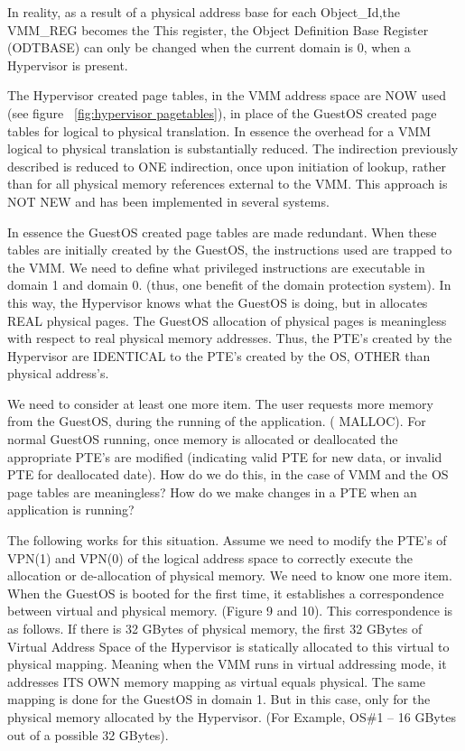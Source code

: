\documentclass{article}
\begin{document}
 In reality, as a result of a physical address base for each Object\_Id,the VMM\_REG becomes the    This register,  the Object Definition Base Register (ODTBASE)  can only be changed when the current domain is 0, when a Hypervisor is present.


 The Hypervisor created page tables, in the VMM address space are NOW used (see figure ~\ref{fig:hypervisor pagetables}), in place of the GuestOS created page tables for logical to physical  translation.   In essence the overhead for a VMM logical to physical  translation is substantially reduced.   The indirection previously described is reduced to ONE indirection, once upon   initiation of lookup,  rather than for all physical memory references external to the VMM. This approach is NOT NEW and has been implemented in several systems.

In essence the GuestOS created page tables are made redundant.  When these tables are initially created by the GuestOS,   the instructions used are trapped to the VMM.  We need to define what privileged instructions are executable in domain 1 and domain 0.  (thus, one benefit of the domain protection system). In this way,  the Hypervisor knows what the GuestOS is doing, but in allocates REAL physical pages.  The GuestOS allocation of physical pages is  meaningless with respect to real physical memory addresses. Thus, the PTE’s created by the Hypervisor are IDENTICAL to the PTE’s created by the OS, OTHER than physical address’s.  

We need to consider at least one more item.  The user requests more memory from the GuestOS, during the running of the application. ( MALLOC).  For normal GuestOS running,  once memory is allocated or deallocated the appropriate PTE’s are modified (indicating valid PTE for new data, or invalid PTE for deallocated date). How do we do this, in the case of VMM and the OS page tables are meaningless?   How do we make changes in a PTE when an application is running?

The following works for this situation.  Assume we need to modify the PTE’s of VPN(1) and VPN(0) of the logical address space  to correctly execute the allocation or de-allocation of physical memory. We need to know one more item.  When the GuestOS is booted for the first time,  it establishes a correspondence  between virtual and physical memory. (Figure 9 and 10). This correspondence is as follows.  If there is 32 GBytes of physical memory,  the first 32 GBytes of Virtual Address Space of the Hypervisor is statically allocated  to this virtual to physical  mapping. Meaning when the VMM runs in virtual addressing mode,  it addresses ITS OWN memory mapping as virtual equals physical.  The same mapping is done for the GuestOS in domain 1.  But in this case, only for the physical memory allocated by the Hypervisor. (For Example, OS\#1 – 16 GBytes out of a possible 32 GBytes).
\end{document}

